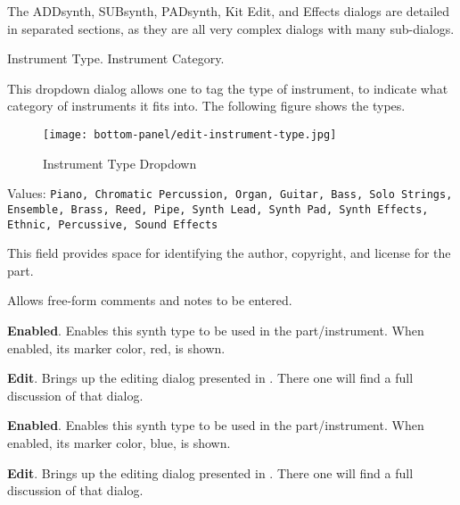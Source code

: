    The ADDsynth, SUBsynth, PADsynth, Kit Edit, and Effects
   dialogs are detailed in separated sections, as they are all
   very complex dialogs with many sub-dialogs.

   Instrument Type.
   Instrument Category.

   This dropdown dialog allows one to tag the type of instrument, to
   indicate what category of instruments it fits into.
   The following figure shows the types.

\begin{figure}[H]
   \centering 
   \texttt{[image: bottom-panel/edit-instrument-type.jpg]}
   \caption{Instrument Type Dropdown}
   \label{fig:instrument_type_dropdown}
\end{figure}

   Values: \texttt{Piano, Chromatic Percussion, Organ, Guitar, Bass,
              Solo Strings, Ensemble, Brass, Reed, Pipe,
              Synth Lead, Synth Pad, Synth Effects, Ethnic,
              Percussive, Sound Effects}

   This field provides space for identifying the author, copyright, and
   license for the part.

   Allows free-form comments and notes to be entered.


   \begin{enumber}
      \item \textbf{Enabled}.
      Enables this synth type to be used in the part/instrument.
      When enabled, its marker color, red, is shown.
      \item \textbf{Edit}.
      Brings up the editing dialog presented in
      .
      There one will find a full discussion of that dialog.
   \end{enumber}


   \begin{enumber}
      \item \textbf{Enabled}.
      Enables this synth type to be used in the part/instrument.
      When enabled, its marker color, blue, is shown.
      \item \textbf{Edit}.
      Brings up the editing dialog presented in
      .
      There one will find a full discussion of that dialog.
   \end{enumber}

